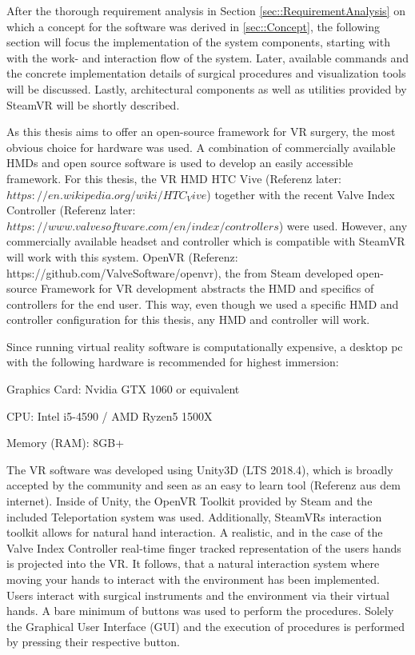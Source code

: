 After the thorough requirement analysis in Section \ref{sec::RequirementAnalysis} on which a concept for the software was derived in \ref{sec::Concept}, 
the following section will focus the implementation of the system components, starting with with the work- and interaction flow of the system.
Later, available commands and the concrete implementation details of surgical procedures and visualization tools will be discussed.
Lastly, architectural components as well as utilities provided by SteamVR will be shortly described.

As this thesis aims to offer an open-source framework for VR surgery, the most obvious choice for hardware was used.
A combination of commercially available HMDs and open source software is used to develop an easily accessible framework.
For this thesis, the VR HMD HTC Vive (Referenz later: $https://en.wikipedia.org/wiki/HTC_Vive$) together with the recent Valve Index Controller (Referenz later: $https://www.valvesoftware.com/en/index/controllers$) were used.
However, any commercially available headset and controller which is compatible with SteamVR will work with this system.
OpenVR (Referenz: https://github.com/ValveSoftware/openvr), the from Steam developed open-source Framework for VR development abstracts the HMD and specifics of controllers for the end user.
This way, even though we used a specific HMD and controller configuration for this thesis, any HMD and controller will work.

Since running virtual reality software is computationally expensive, a desktop pc with the following hardware is recommended for highest immersion:

\begin{compactenum}[label=(\alph*)]
    \item Graphics Card: Nvidia GTX 1060 or equivalent
    \item CPU: Intel i5-4590 / AMD Ryzen5 1500X
    \item Memory (RAM): 8GB+
\end{compactenum}

The VR software was developed using Unity3D (LTS 2018.4), which is broadly accepted by the community and seen as an easy to learn tool (Referenz aus dem internet).
Inside of Unity, the OpenVR Toolkit provided by Steam and the included Teleportation system was used.
Additionally, SteamVRs interaction toolkit allows for natural hand interaction.
A realistic, and in the case of the Valve Index Controller real-time finger tracked representation of the users hands is projected into the VR.
It follows, that a natural interaction system where moving your hands to interact with the environment has been implemented.
Users interact with surgical instruments and the environment via their virtual hands.
A bare minimum of buttons was used to perform the procedures.
Solely the Graphical User Interface (GUI) and the execution of procedures is performed by pressing their respective button.

